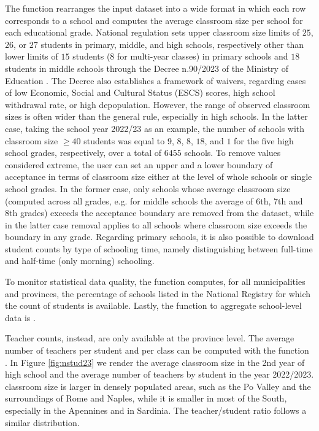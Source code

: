 \documentclass[openany, 11pt, oneside]{book}
\begin{document}
The function \texttt{} rearranges the input dataset into a wide format in which each row corresponds to a school and computes the average classroom size per school for each educational grade. National regulation sets upper classroom size limits of $25$, $26$, or $27$ students in primary, middle, and high schools, respectively \parencite[][Art. 5]{DMIM90} other than lower limits of $15$ students (8 for multi-year classes) in primary schools and $18$ students in middle schools through the Decree n.90/2023 of the Ministry of Education \parencite[][Artt 10, 11]{DPR81}. The Decree also establishes a framework of waivers, regarding cases of low Economic, Social and Cultural Status (ESCS) scores, high school withdrawal rate, or high depopulation. 
However, the range of observed classroom sizes is often wider than the general rule, especially in high schools. In the latter case, taking the school year 2022/23 as an example, the number of schools with classroom size $\geq 40$ students was equal to $9$, $8$, $8$, $18$, and $1$ for the five high school grades, respectively, over a total of $6455$ schools.
To remove values considered extreme, the user can set an upper and a lower boundary of acceptance in terms of classroom size either at the level of whole schools or single school grades. In the former case, only schools whose average classroom size (computed across all grades, e.g. for middle schools the average of 6th, 7th and 8th grades) exceeds the acceptance boundary are removed from the dataset, while in the latter case removal applies to all schools where classroom size exceeds the boundary in any grade.
Regarding primary schools, it is also possible to download student counts by type of schooling time, namely distinguishing between full-time and half-time (only morning) schooling.

To monitor statistical data quality, the function \texttt{} computes, for all municipalities and provinces, the percentage of schools listed in the National Registry for which the count of students is available. Lastly, the function to aggregate school-level data is \texttt{}.

Teacher counts, instead, are only available at the province level. The average number of teachers per student and per class can be computed with the function \texttt{}. In Figure \ref{fig:nstud23} we render the average classroom size in the 2nd year of high school and the average number of teachers by student in the year 2022/2023. classroom size is larger in densely populated areas, such as the Po Valley and the surroundings of Rome and Naples, while it is smaller in most of the South, especially in the Apennines and in Sardinia. The teacher/student ratio follows a similar distribution.
\end{document}
